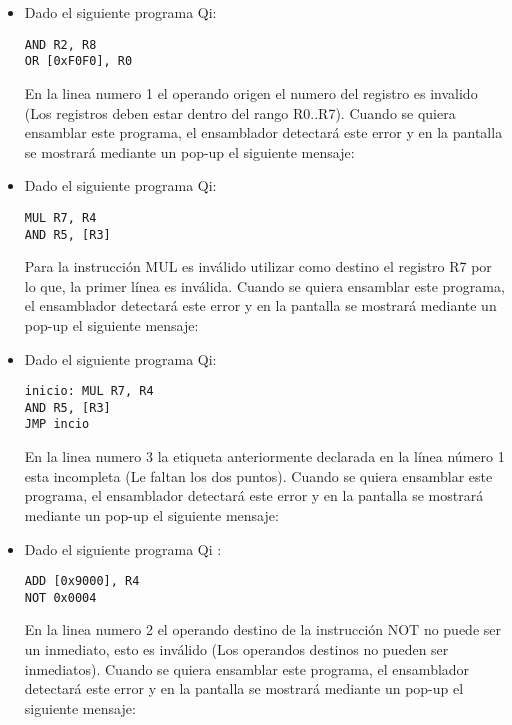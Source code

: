 \begin{itemize}

\item Dado el siguiente programa Qi:

\begin{verbatim}
AND R2, R8
OR [0xF0F0], R0
\end{verbatim}

En la linea numero 1 el operando origen el numero del registro es invalido (Los registros deben estar dentro del rango R0..R7). Cuando se quiera ensamblar este programa, el ensamblador detectará este error y en la pantalla se mostrará mediante un pop-up el siguiente mensaje:


\item Dado el siguiente programa Qi:

\begin{verbatim}
MUL R7, R4
AND R5, [R3]
\end{verbatim}

Para la instrucción MUL es inválido utilizar como destino el registro R7 por lo que, la primer línea es inválida. Cuando se quiera ensamblar este programa, el ensamblador detectará este error y en la pantalla se mostrará mediante un pop-up el siguiente mensaje:


\item Dado el siguiente programa Qi:

\begin{verbatim}
inicio: MUL R7, R4
AND R5, [R3]
JMP incio
\end{verbatim}

En la linea numero 3 la etiqueta anteriormente declarada en la línea número 1 esta incompleta (Le faltan los dos puntos). Cuando se quiera ensamblar este programa, el ensamblador detectará este error y en la pantalla se mostrará mediante un pop-up el siguiente mensaje:



\item Dado el siguiente programa Qi :

\begin{verbatim}
ADD [0x9000], R4
NOT 0x0004
\end{verbatim}

En la linea numero 2 el operando destino de la instrucción NOT no puede ser un inmediato, esto es inválido (Los operandos destinos no pueden ser inmediatos). Cuando se quiera ensamblar este programa, el ensamblador detectará este error y en la pantalla se mostrará mediante un pop-up el siguiente mensaje:


\end{itemize}
